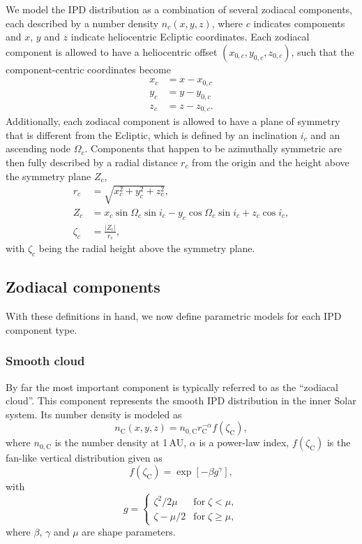 \documentclass[twocolumn]{aa}
\begin{document}
We model the IPD distribution as a combination of several zodiacal
components, each described by a number density $n_c(x,y,z)$, where $c$
indicates components and $x$, $y$ and $z$ indicate heliocentric
Ecliptic coordinates. Each zodiacal component is allowed to have a
heliocentric offset $(x_{0,c}, y_{0,c}, z_{0,c})$, such that the
component-centric coordinates become
\begin{equation}    
    \begin{aligned}
        x_c&= x - x_{0,c}\\
        y_c&= y - y_{0,c}\\
        z_c&= z - z_{0,c}.
    \end{aligned}
\end{equation}
Additionally, each zodiacal component is allowed to have a plane of
symmetry that is different from the Ecliptic, which is defined by an
inclination $i_c$ and an ascending node $\Omega_c$. Components that
happen to be azimuthally symmetric are then fully described by a
radial distance $r_c$ from the origin and the height above the
symmetry plane $Z_c$,
\begin{align}
    r_c &= \sqrt{x_c^2 + y_c^2 + z_c^2},\\
    Z_c &= x_c\sin{\Omega_c}\sin{i_c} - y_c \cos{\Omega_c}\sin{i_c} + z_c \cos{i_c},\\
    \zeta_c &= \frac{|Z_\mathrm{c}|}{r_\mathrm{c}},
\end{align}
with $\zeta_c$ being the radial height above the symmetry plane.

\subsection{Zodiacal components}

With these definitions in hand, we now define parametric models for
each IPD component type.

\subsubsection{Smooth cloud}
By far the most important component is typically referred to as the
``zodiacal cloud''. This component represents the smooth IPD
distribution in the inner Solar system. Its number density is
modeled as
\begin{equation}
    n_\mathrm{C}(x,y,z)=n_{0,
      \mathrm{C}}r_\mathrm{C}^{-\alpha}f(\zeta_\mathrm{C}),
    \label{eq:cloud}
\end{equation}
where $n_{0, \mathrm{C}}$ is the number density at 1\,AU, $\alpha$ is a 
power-law index, $f(\zeta_\mathrm{C})$ is the fan-like vertical 
distribution given as 
\begin{equation}
    f(\zeta_\mathrm{C}) = \exp {\left[-\beta g^\gamma \right]},
\end{equation}
with
\begin{equation}
    g = \begin{cases}
        \zeta^2/2\mu & \mathrm{for}\; \zeta < \mu,\\
        \zeta - \mu/2 & \mathrm{for}\; \zeta \geq \mu,
    \end{cases}
\end{equation}
where $\beta$, $\gamma$ and $\mu$ are shape parameters.
\end{document}
